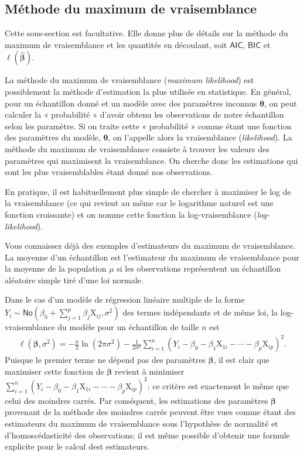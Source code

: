 \documentclass[
  11pt,
  letterpaper,
]{scrbook}
\theoremstyle{definition}
\theoremstyle{remark}
\begin{document}
\hypertarget{muxe9thode-du-maximum-de-vraisemblance}{%
\subsection{Méthode du maximum de
vraisemblance}\label{muxe9thode-du-maximum-de-vraisemblance}}

Cette sous-section est facultative. Elle donne plus de détails sur la
méthode du maximum de vraisemblance et les quantités en découlant, soit
\(\mathsf{AIC}\), \(\mathsf{BIC}\) et
\(\ell(\widehat{\boldsymbol{\beta}})\).

La méthode du maximum de vraisemblance (\emph{maximum likelihood}) est
possiblement la méthode d'estimation la plus utilisée en statistique. En
général, pour un échantillon donné et un modèle avec des paramètres
inconnus \(\boldsymbol{\theta}\), on peut calculer la « probabilité »
d'avoir obtenu les observations de notre échantillon selon les
paramètre. Si on traite cette « probabilité » comme étant une fonction
des paramètres du modèle, \(\boldsymbol{\theta}\), on l'appelle alors la
vraisemblance (\emph{likelihood}). La méthode du maximum de
vraisemblance consiste à trouver les valeurs des paramètres qui
maximisent la vraisemblance. On cherche donc les estimations qui sont
les plus vraisemblables étant donné nos observations.

En pratique, il est habituellement plus simple de chercher à maximiser
le log de la vraisemblance (ce qui revient au même car le logarithme
naturel est une fonction croissante) et on nomme cette fonction la
log-vraisemblance (\emph{log-likelihood}).

Vous connaissez déjà des exemples d'estimateurs du maximum de
vraisemblance. La moyenne d'un échantillon est l'estimateur du maximum
de vraisemblance pour la moyenne de la population \(\mu\) si les
observations représentent un échantillon aléatoire simple tiré d'une loi
normale.

Dans le cas d'un modèle de régression linéaire multiple de la forme
\(Y_i \sim \mathsf{No}(\beta_0 + \sum_{j=1}^p \beta_j\mathrm{X}_{ij}, \sigma^2)\)
des termes indépendants et de même loi, la log-vraisemblance du modèle
pour un échantillon de taille \(n\) est \begin{align*}
 \ell(\boldsymbol{\beta}, \sigma^2) =- \frac{n}{2} \ln(2\pi\sigma^2) - \frac{1}{2\sigma^2}\sum_{i=1}^n (Y_i- \beta_0 - \beta_1 \mathrm{X}_{1i} - \cdots - \beta_p\mathrm{X}_{ip})^2.
\end{align*} Puisque le premier terme ne dépend pas des paramètres
\(\boldsymbol{\beta}\), il est clair que maximiser cette fonction de
\(\boldsymbol{\beta}\) revient à minimiser
\(\sum_{i=1}^n (Y_i- \beta_0 - \beta_1 \mathrm{X}_{1i} - \cdots - \beta_p\mathrm{X}_{ip})^2\):
ce critère est exactement le même que celui des moindres carrés. Par
conséquent, les estimations des paramètres \(\boldsymbol{\beta}\)
provenant de la méthode des moindres carrés peuvent être vues comme
étant des estimateurs du maximum de vraisemblance sous l'hypothèse de
normalité et d'homoscédasticité des observations; il est même possible
d'obtenir une formule explicite pour le calcul dest estimateurs.
\end{document}
